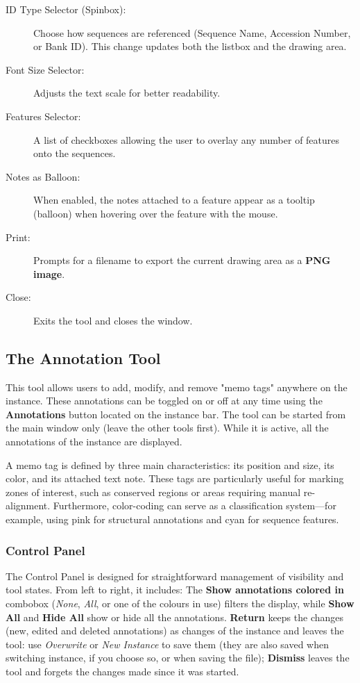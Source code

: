 \documentclass[a4paper]{article}
\begin{document}
\begin{description}
    \item[ID Type Selector (Spinbox):] Choose how sequences are referenced (Sequence Name, Accession Number, or Bank ID). This change updates both the listbox and the drawing area.
    \item[Font Size Selector:] Adjusts the text scale for better readability.
    \item[Features Selector:] A list of checkboxes allowing the user to overlay any number of features onto the sequences.
    \item[Notes as Balloon:] When enabled, the notes attached to a feature appear as a tooltip (balloon) when hovering over the feature with the mouse.
    \item[Print:] Prompts for a filename to export the current drawing area as a \textbf{PNG image}.
    \item[Close:] Exits the tool and closes the window.
\end{description}


\subsection{The Annotation Tool}
\label{tool-annotate}

This tool allows users to add, modify, and remove "memo tags" anywhere on the instance. These annotations can be toggled on or off at any time using the \textbf{Annotations} button located on the instance bar. The tool can be started from the main window only (leave the other tools first). While it is active, all the annotations of the instance are displayed.

A memo tag is defined by three main characteristics: its position and size, its color, and its attached text note. These tags are particularly useful for marking zones of interest, such as conserved regions or areas requiring manual re-alignment. Furthermore, color-coding can serve as a classification system—for example, using pink for structural annotations and cyan for sequence features.

\subsubsection{Control Panel}
The Control Panel is designed for straightforward management of visibility and tool states. From left to right, it includes:
The \textbf{Show annotations colored in} combobox (\textit{None}, \textit{All}, or one of the colours in use) filters the display, while \textbf{Show All} and \textbf{Hide All} show or hide all the annotations. \textbf{Return} keeps the changes (new, edited and deleted annotations) as changes of the instance and leaves the tool: use \textit{Overwrite} or \textit{New Instance} to save them (they are also saved when switching instance, if you choose so, or when saving the file); \textbf{Dismiss} leaves the tool and forgets the changes made since it was started.
\end{document}
